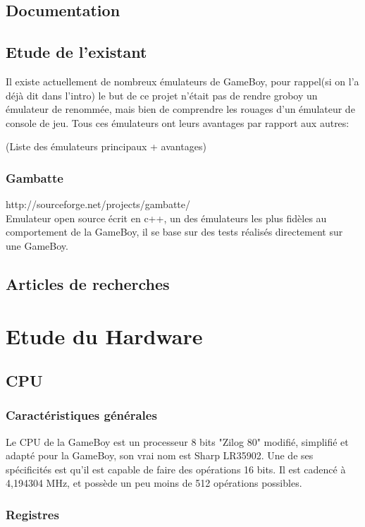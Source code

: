 \documentclass{report}
\begin{document}
\section{Documentation}
\section{Etude de l'existant}
Il existe actuellement de nombreux émulateurs de GameBoy, pour rappel(si on l'a déjà dit dans l'intro) le but de ce projet n'était pas de rendre groboy un émulateur de renommée, mais bien de comprendre les rouages d'un émulateur de console de jeu.
Tous ces émulateurs ont leurs avantages par rapport aux autres:

(Liste des émulateurs principaux + avantages)
\subsection{Gambatte}
http://sourceforge.net/projects/gambatte/\\
Emulateur open source écrit en c++, un des émulateurs les plus fidèles au comportement de la GameBoy, il se base sur des tests réalisés directement sur une GameBoy.
\section{Articles de recherches}

\chapter{Etude du Hardware}
\section{CPU}
\subsection{Caractéristiques générales}
Le CPU de la GameBoy est un processeur 8 bits "Zilog 80" modifié, simplifié et adapté pour la GameBoy, son vrai nom est Sharp LR35902.
Une de ses spécificités est qu'il est capable de faire des opérations 16 bits.
Il est cadencé à 4,194304 MHz, et possède un peu moins de 512 opérations possibles.
\subsection{Registres}
\end{document}
